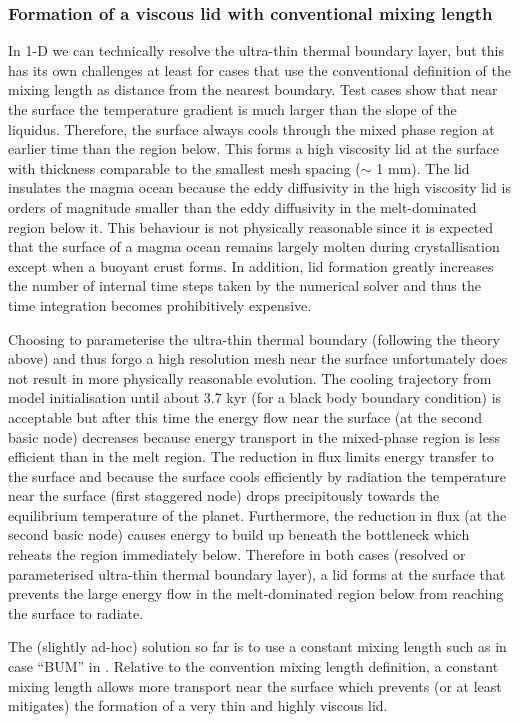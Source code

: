 \subsubsection{Formation of a viscous lid with conventional mixing length}
In 1-D we can technically resolve the ultra-thin thermal boundary layer, but this has its own challenges at least for cases that use the conventional definition of the mixing length as distance from the nearest boundary.  Test cases show that near the surface the temperature gradient is much larger than the slope of the liquidus.  Therefore, the surface always cools through the mixed phase region at earlier time than the region below.  This forms a high viscosity lid at the surface with thickness comparable to the smallest mesh spacing ($\sim$ 1 mm).  The lid insulates the magma ocean because the eddy diffusivity in the high viscosity lid is orders of magnitude smaller than the eddy diffusivity in the melt-dominated region below it.  This behaviour is not physically reasonable since it is expected that the surface of a magma ocean remains largely molten during crystallisation except when a buoyant crust forms.  In addition, lid formation greatly increases the number of internal time steps taken by the numerical solver and thus the time integration becomes prohibitively expensive.

Choosing to parameterise the ultra-thin thermal boundary (following the theory above) and thus forgo a high resolution mesh near the surface unfortunately does not result in more physically reasonable evolution.  The cooling trajectory from model initialisation until about 3.7 kyr (for a black body boundary condition) is acceptable but after this time the energy flow near the surface (at the second basic node) decreases because energy transport in the mixed-phase region is less efficient than in the melt region.  The reduction in flux limits energy transfer to the surface and because the surface cools efficiently by radiation the temperature near the surface (first staggered node) drops precipitously towards the equilibrium temperature of the planet.  Furthermore, the reduction in flux (at the second basic node) causes energy to build up beneath the bottleneck which reheats the region immediately below.  Therefore in both cases (resolved or parameterised ultra-thin thermal boundary layer), a lid forms at the surface that prevents the large energy flow in the melt-dominated region below from reaching the surface to radiate.

The (slightly ad-hoc) solution so far is to use a constant mixing length such as in case ``BUM'' in \cite{BSW18}.  Relative to the convention mixing length definition, a constant mixing length allows more transport near the surface which prevents (or at least mitigates) the formation of a very thin and highly viscous lid.

